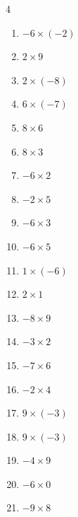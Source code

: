 \begin{multicols}{4}
\begin{enumerate}
  \item $-6\times (-2)$
        \phantom{$=12$}

  \item $2\times 9$
        \phantom{$=18$}

  \item $2\times (-8)$
        \phantom{$=-16$}

  \item $6\times (-7)$
        \phantom{$=-42$}

  \item $8\times 6$
        \phantom{$=48$}

\columnbreak %

  \item $8\times 3$
        \phantom{$=24$}

  \item $-6\times 2$
        \phantom{$=-12$}

  \item $-2\times 5$
        \phantom{$=-10$}

  \item $-6\times 3$
        \phantom{$=-18$}

  \item $-6\times 5$
        \phantom{$=-30$}

  \item $1\times (-6)$
        \phantom{$=-6$}

  \item $2\times 1$
        \phantom{$=2$}

  \item $-8\times 9$
        \phantom{$=-72$}

  \item $-3\times 2$
        \phantom{$=-6$}

  \item $-7\times 6$
        \phantom{$=-42$}

  \item $-2\times 4$
        \phantom{$=-8$}

  \item $9\times (-3)$
        \phantom{$=-27$}

  \item $9\times (-3)$
        \phantom{$=-27$}

  \item $-4\times 9$
        \phantom{$=-36$}

  \item $-6\times 0$
        \phantom{$=0$}

  \item $-9\times 8$
        \phantom{$=-72$}


\end{enumerate}
\end{multicols}
